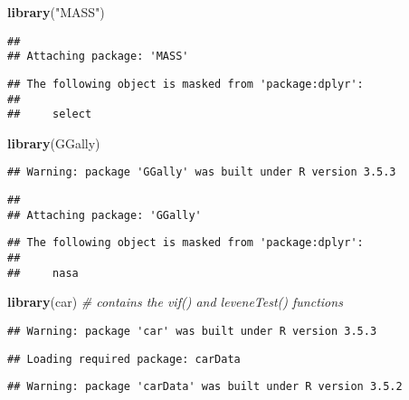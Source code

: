 \documentclass[12pt,]{article}
\newenvironment{Shaded}{\begin{snugshade}}{\end{snugshade}}
\newcommand{\KeywordTok}[1]{\textcolor[rgb]{0.13,0.29,0.53}{\textbf{#1}}}
\newcommand{\StringTok}[1]{\textcolor[rgb]{0.31,0.60,0.02}{#1}}
\newcommand{\CommentTok}[1]{\textcolor[rgb]{0.56,0.35,0.01}{\textit{#1}}}
\newcommand{\NormalTok}[1]{#1}
\begin{document}
\begin{Shaded}
\begin{Highlighting}[]
\KeywordTok{library}\NormalTok{(}\StringTok{"MASS"}\NormalTok{)}
\end{Highlighting}
\end{Shaded}

\begin{verbatim}
## 
## Attaching package: 'MASS'
\end{verbatim}

\begin{verbatim}
## The following object is masked from 'package:dplyr':
## 
##     select
\end{verbatim}

\begin{Shaded}
\begin{Highlighting}[]
\KeywordTok{library}\NormalTok{(GGally)}
\end{Highlighting}
\end{Shaded}

\begin{verbatim}
## Warning: package 'GGally' was built under R version 3.5.3
\end{verbatim}

\begin{verbatim}
## 
## Attaching package: 'GGally'
\end{verbatim}

\begin{verbatim}
## The following object is masked from 'package:dplyr':
## 
##     nasa
\end{verbatim}

\begin{Shaded}
\begin{Highlighting}[]
\KeywordTok{library}\NormalTok{(car) }\CommentTok{# contains the vif() and leveneTest() functions}
\end{Highlighting}
\end{Shaded}

\begin{verbatim}
## Warning: package 'car' was built under R version 3.5.3
\end{verbatim}

\begin{verbatim}
## Loading required package: carData
\end{verbatim}

\begin{verbatim}
## Warning: package 'carData' was built under R version 3.5.2
\end{verbatim}
\end{document}
